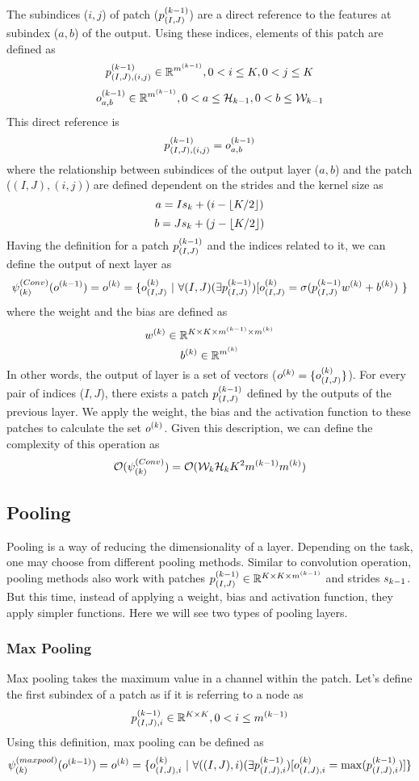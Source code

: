 The subindices ($i,j$) of patch ($\pki{k-1}{(I,J)}$) are a direct reference to the features at subindex ($a,b$) of the output. Using these indices, elements of this patch are defined as
$$ \pki{k-1}{(I,J),(i,j)} \inreal{\mk{k-1}} , 0 < i \leq \kernelsize, 0 < j \leq \kernelsize$$
$$ \oki{k-1}{a,b} \inreal{\mk{k-1}} , 0 < a \leq \heightk{k-1}, 0 < b \leq  \widthk{k-1} $$
This direct reference is
$$ \pki{k-1}{(I,J),(i,j)} = \oki{k-1}{a,b} $$
where the relationship between subindices of the output layer ($a,b$) and the patch ($(I,J),(i,j)$) are defined dependent on the strides and the kernel size as
$$ a = I\sk{k} + (i - \floor*{\kernelsize/2}) $$
$$ b = J\sk{k} + (j - \floor*{\kernelsize/2}) $$
Having the definition for a patch $\pki{k-1}{(I,J)}$ and the indices related to it, we can define the output of next layer as
$$\convk{k}(\ok{k-1}) = \ok{k} = \{\oki{k}{(I,J)} \ | \ \forall (I,J) (\exists \pki{k-1}{(I,J)}) [ \oki{k}{(I,J)} = \sigma(\pki{k-1}{(I,J)} \wk{k} + \bk{k})\ \}  $$
where the weight and the bias are defined as
$$ \wk{k} \inreal{\kernelsize \times \kernelsize \times \mk{k-1} \times \mk{k}} $$
$$ \bk{k} \inreal{\mk{k}}$$
In other words, the output of layer is a set of vectors ($\ok{k} = \{\oki{k}{(I,J)}\}$). For every pair of indices ($I,J$), there exists a patch $\pki{k-1}{(I,J)}$ defined by the outputs of the previous layer. We apply the weight, the bias and the activation function to these patches to calculate the set $\ok{k}$. Given this description, we can define the complexity of this operation as
$$ \bigo{\convk{k}} = \bigo{\widthk{k}\heightk{k}\kernelsize^2\mk{k-1}\mk{k}} $$


\subsection{Pooling}
Pooling is a way of reducing the dimensionality of a layer. Depending on the task, one may choose from different pooling methods. Similar to convolution operation, pooling methods also work with patches $\pki{k-1}{(I,J)} \inreal{\kernelsize \times \kernelsize \times \mk{k-1}}$ and strides $\sk{k-1}$. But this time, instead of applying a weight, bias and activation function, they apply simpler functions. Here we will see two types of pooling layers.

\subsubsection{Max Pooling}
Max pooling takes the maximum value in a channel within the patch. Let's define the first subindex of a patch as if it is referring to a node as
$$ \pki{k-1}{(I,J),i} \inreal{\kernelsize \times \kernelsize}, 0 < i \leq \mk{k-1} $$
Using this definition, max pooling can be defined as
$$ \maxpoolk{k}(\ok{k-1}) = \ok{k} = \{ \oki{k}{(I,J),i} \ | \ \forall ((I,J),i) (\exists \pki{k-1}{(I,J),i}) [\oki{k}{(I,J),i} = \max(\pki{k-1}{(I,J),i})]  \}  $$

